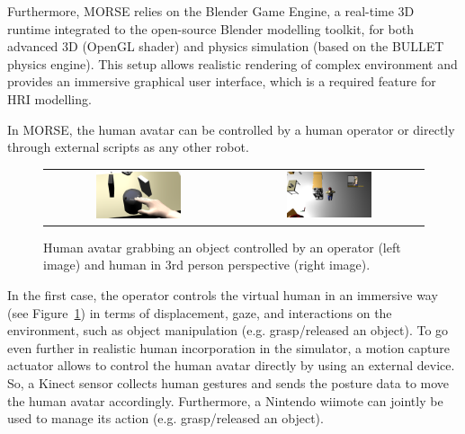 \documentclass[a4paper,11pt,twoside]{StyleThese}
\begin{document}
Furthermore, MORSE relies on the Blender Game Engine,
a real-time 3D runtime integrated to the open-source Blender
modelling toolkit, for both advanced 3D (OpenGL shader) and
physics simulation (based on the BULLET physics engine).
This setup allows realistic rendering of complex environment and provides an immersive graphical user interface, which is a required feature %
for HRI modelling. 

In MORSE, the human avatar can be controlled by a human operator or directly through external scripts as any other robot.  

\begin{figure}[ht!]
 \centering
 \begin{tabular}{cc}
  \includegraphics[width=0.475\textwidth]{img/Screenshot_from_2014-04-29_14_02_14.png} &
  \includegraphics[width=0.475\textwidth]{img/Screenshot_from_2014-04-29_14_21_24.png}
 \end{tabular}
 \caption{Human avatar grabbing an object controlled by an operator (left image) and human in 3rd person perspective (right image).}
 \label{fig:human_morse}
   \vspace{-3pt}
 \end{figure}
In the first case, the operator controls the virtual human in an immersive way (see Figure~\ref{fig:human_morse}) in terms of displacement, gaze, and interactions on the environment, such as object manipulation (e.g. grasp/released an object).
To go even further in realistic human incorporation in the simulator, 
a motion capture actuator allows to control the human avatar directly 
by using an external device. So, a Kinect sensor collects human gestures and sends the posture data to %
move the human avatar accordingly.
Furthermore, a Nintendo wiimote can jointly be used to manage its action (e.g. grasp/released an object).
\end{document}

